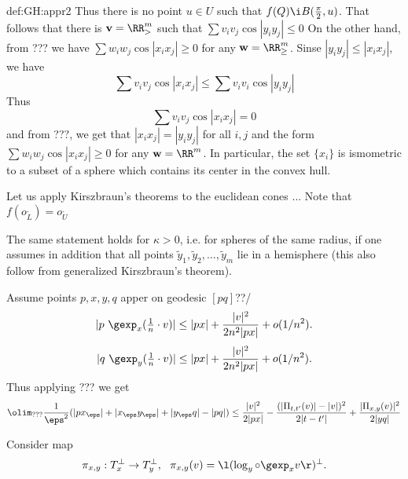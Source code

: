 {\begin{subthm}{def:GH:appr2}
Thus there is no point $u\in U$ such that $f(Q)\i B(\tfrac\pi2, u)$.
That follows that there is $\mathbf v=\RR_>^m$ such that
$\sum v_iv_j\cos|y_iy_j|\le 0$
On the other hand, from ??? we have
$\sum w_iw_j\cos|x_ix_j|\ge 0$
for any $\mathbf w=\RR_\ge^m$.
Sinse $|y_iy_j|\le |x_ix_j|$, we have 
$$\sum v_iv_j\cos|x_ix_j|\le \sum v_iv_i\cos|y_iy_j|$$
Thus $$\sum v_iv_j\cos|x_ix_j|=0$$ and from ???, we get that $|x_ix_j|=|y_iy_j|$ for all $i,j$ and the form $\sum w_iw_j\cos|x_ix_j|\ge 0$
for any $\mathbf w=\RR^m$.
In particular, the set $\{x_i\}$ is ismometric to a subset of a sphere which contains its center in the convex hull.

Let us apply Kirszbraun's theorems to the euclidean cones ...
Note that $f(o_{\mathring L})=o_{\mathring U}$
\qeds











 The same statement holds for $\kappa>0$, i.e. for spheres of the same radius, if one assumes in addition that all points $\tilde y_1,\tilde y_2,\dots,\tilde y_m$ lie in a hemisphere (this also follow from generalized Kirszbraun's theorem).






















 Assume points $p,x,y,q$ apper on geodesic $[pq]$??/
$$|p\ \gexp_{x}(\tfrac1n\cdot v)|\le |px|+\frac{|v|^2}{2n^2|px|}+o(1/n^2).$$
$$|q\ \gexp_{y}(\tfrac1n\cdot v)|\le |px|+\frac{|v|^2}{2n^2|px|}+o(1/n^2).$$
Thus applying ??? we get 
$$\olim_{???}\frac1{\eps^2}(|px_\eps|+|x_\eps y_\eps|+|y_\eps q|-|pq|)\le \frac{|v|^2}{2|px|}-\frac{(|\Pi_{t,t'}(v)|-|v|)^2}{2|t-t'|}+\frac{|\Pi_{x,y}(v)|^2}{2|yq|}$$
\qeds














Consider map
$$\pi_{x,y}:T_x^\perp\to T_y^\perp,\ \ \pi_{x,y}(v)=\l(\log_{y}\circ\gexp_{x}v\r)^\perp.$$


\end{subthm}}
